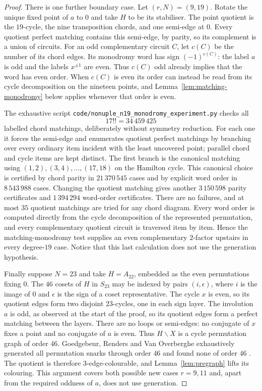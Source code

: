 \documentclass[11pt,a4paper]{article}
\theoremstyle{definition}
\theoremstyle{remark}
\begin{document}
\begin{proof}
There is one further boundary case.  Let $(r,N)=(9,19)$.  Rotate the unique fixed point of $a$ to $0$ and take $H$ to be its stabiliser.  The point quotient is the $19$-cycle, the nine transposition chords, and one semi-edge at $0$.  Every quotient perfect matching contains this semi-edge, by parity, so its complement is a union of circuits.  For an odd complementary circuit $C$, let $c(C)$ be the number of its chord edges.  Its monodromy word has sign $(-1)^{c(C)}$: the label $a$ is odd and the labels $x^{\pm1}$ are even.  Thus $c(C)$ odd already implies that the word has even order.  When $c(C)$ is even its order can instead be read from its cycle decomposition on the nineteen points, and Lemma~\ref{lem:matching-monodromy} below applies whenever that order is even.

The exhaustive script \nolinkurl{code/nonuple_n19_monodromy_experiment.py} checks all
\[
 17!!=34\,459\,425
\]
labelled chord matchings, deliberately without symmetry reduction.  For each one it forces the semi-edge and enumerates quotient perfect matchings by branching over every ordinary item incident with the least uncovered point; parallel chord and cycle items are kept distinct.  The first branch is the canonical matching using $(1,2),(3,4),\ldots,(17,18)$ on the Hamilton cycle.  This canonical choice is certified by chord parity in $21\,370\,545$ cases and by explicit word order in $8\,543\,988$ cases.  Changing the quotient matching gives another $3\,150\,598$ parity certificates and $1\,394\,294$ word-order certificates.  There are no failures, and at most $35$ quotient matchings are tried for any chord diagram.  Every word order is computed directly from the cycle decomposition of the represented permutation, and every complementary quotient circuit is traversed item by item.  Hence the matching-monodromy test supplies an even complementary $2$-factor upstairs in every degree-$19$ case.  Notice that this last calculation does not use the generation hypothesis.

Finally suppose $N=23$ and take $H=A_{22}$, embedded as the even permutations fixing $0$.  The $46$ cosets of $H$ in $S_{23}$ may be indexed by pairs $(i,\epsilon)$, where $i$ is the image of $0$ and $\epsilon$ is the sign of a coset representative.  The cycle $x$ is even, so its quotient edges form two disjoint $23$-cycles, one in each sign layer.  The involution $a$ is odd, as observed at the start of the proof, so its quotient edges form a perfect matching between the layers.  There are no loops or semi-edges: no conjugate of $x$ fixes a point and no conjugate of $a$ is even.  Thus $H\backslash X$ is a cycle permutation graph of order $46$.  Goedgebeur, Renders and Van Overberghe exhaustively generated all permutation snarks through order $46$ and found none of order $46$ \cite{GoedgebeurRendersVanOverberghe26}.  The quotient is therefore $3$-edge-colourable, and Lemma~\ref{lem:pregraph} lifts its colouring.  This argument covers both possible new cases $r=9,11$ and, apart from the required oddness of $a$, does not use generation.


\end{proof}
\end{document}
